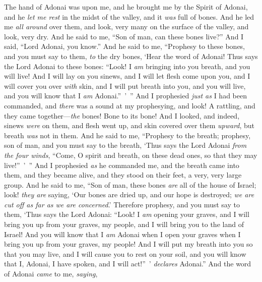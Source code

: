 \begin{biblechapter} %
 The hand of Adonai was upon me, and he brought me by the Spirit of Adonai, and he \textit{let me rest} in the midst of the valley, and it \textit{was} full of bones.
\verse And he led me \textit{all around} over them, and look, very many on the surface of the valley, and look, very dry.
\verse And he said to me, “Son of man, can these bones live?” And I said, “Lord Adonai, you know.”
\verse And he said to me, “Prophesy to these bones, and you must say to them, \textit{to} the dry bones, ‘Hear the word of Adonai!
\verse Thus says the Lord Adonai to these bones: “Look! I \textit{am} bringing into you breath, and you will live!
\verse And I will lay on you sinews, and I will let flesh come upon you, and I will cover you over \textit{with} skin, and I will put breath into you, and you will live, and you will know that I \textit{am} Adonai.” ’ ”
\verse And I prophesied \textit{just as} I had been commanded, and \textit{there} was a sound at my prophesying, and look! A rattling, and they came together—\textit{the} bones! Bone to its bone!
\verse And I looked, and indeed, sinews \textit{were} on them, and flesh went up, and skin covered over them \textit{upward}, but breath \textit{was} not in them.
\verse And he said to me, “Prophesy to the breath; prophesy, son of man, and you must say to the breath, ‘Thus says the Lord Adonai \textit{from the four winds}, “Come, O spirit and breath, on these dead ones, so that they may live!” ’ ”
\verse And I prophesied \textit{as} he commanded me, and the breath came into them, and they became alive, and they stood on their feet, a very, very large group.
\verse And he said to me, “Son of man, these bones \textit{are} all of the house of Israel; look! \textit{they are} saying, ‘Our bones are dried up, and our hope is destroyed; \textit{we are cut off as far as we are concerned}.’
\verse Therefore prophesy, and you must say to them, ‘Thus says the Lord Adonai: “Look! I \textit{am} opening your graves, and I will bring you up from your graves, my people, and I will bring you to the land of Israel!
\verse And you will know that I \textit{am} Adonai when I open your graves when I bring you up from your graves, my people!
\verse And I will put my breath into you so that you may live, and I will cause you to rest on your soil, and you will know that I, Adonai, I have spoken, and I will act!” ’ \textit{declares} Adonai.”
\verse And the word of Adonai \textit{came} to me, \textit{saying},

\end{biblechapter}
